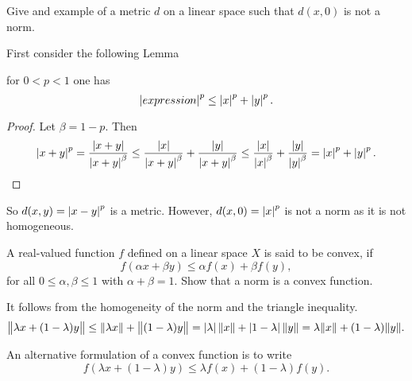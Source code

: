 \begin{problem}
	Give and example of a metric $ d $ on a linear space such that $ d(x,0) $ is not a norm.
\end{problem}
\begin{solution}
	First consider the following Lemma
	\begin{lemma}
		for $ 0<p<1 $ one has
		\[ \left|expression\right|^p \leq \left|x\right|^p + \left|y\right|^p. \]
		\begin{proof}
			Let $ \beta = 1-p $. Then
			\[ \left|x+y\right|^p = \frac{\left|x+y\right|}{\left|x+y\right|^{\beta}}\leq \frac{\left|x\right|}{\left|x+y\right|^\beta} + \frac{\left|y\right|}{\left|x+y\right|^\beta} \leq \frac{\left|x\right|}{\left|x\right|^\beta} + \frac{\left|y\right|}{\left|y\right|^\beta} = \left|x\right|^p + \left|y\right|^p. \]
		\end{proof}
		So $ d(x,y) = \left|x-y\right|^p $ is a metric. However, $ d(x,0) = \left|x\right|^p $ is not a norm as it is not homogeneous.
 	\end{lemma}
\end{solution}


\begin{problem}
	A real-valued function $ f $ defined on a linear space $ X $ is said to be convex, if
	\[ f(\alpha x + \beta y) \leq \alpha f(x) + \beta f(y), \]
	for all $ 0\leq \alpha,\beta \leq 1 $ with $ \alpha + \beta = 1 $. Show that a norm is a convex function.
\end{problem}
\begin{solution}
	It follows from the homogeneity of the norm and the triangle inequality.
	\[ \norm{\lambda x + (1-\lambda)y} \leq \norm{\lambda x} + \norm{(1-\lambda)y} = \left|\lambda\right| \norm{x} + \left|1-\lambda\right|\norm{y} = \lambda\norm{x} + (1-\lambda)\norm{y}. \] 
\end{solution}

\begin{remark}
	An alternative formulation of a convex function is to write
	\[ f(\lambda x + (1-\lambda)y) \leq \lambda f(x) + (1-\lambda)f(y). \]
\end{remark}




















